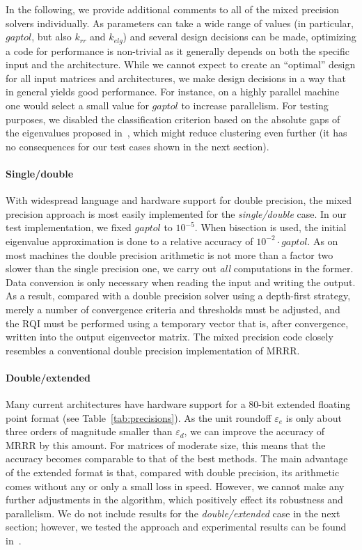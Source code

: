 \documentclass[final]{siamltex}
\begin{document}
In the following, we provide
additional comments to all of the mixed precision solvers individually. 
As parameters can take a wide range of values (in particular, $gaptol$, but also $k_{rr}$ and
$k_{elg}$) and several design decisions can be made, optimizing a code for performance
is non-trivial as it generally depends on both the specific input and the architecture. 
While we cannot expect to create an ``optimal''
design for all input matrices and architectures, we make design
decisions in a way that in general yields good performance. 
For instance, on
a highly parallel machine one would select a small value for $gaptol$ to
increase parallelism. For testing purposes, we disabled the
classification criterion based on the absolute gaps of the eigenvalues
proposed in~\cite{VoemelRefinedTree2007tr}, which might reduce clustering even
further (it has no consequences for our test cases shown in the next section). 

\paragraph{Single/double} With widespread language and hardware support for
  double precision, the mixed precision approach is most easily implemented
  for the {\it single/double} case. In our test implementation, we fixed
  $gaptol$ to $10^{-5}$. When bisection is used, the initial eigenvalue
  approximation is done to a relative accuracy of $10^{-2} \cdot gaptol$. As
  on most machines the double precision arithmetic is not more than a factor two
  slower than the single precision one, we carry out {\it all} computations in
  the former. Data conversion is only necessary when reading the input and
  writing the output. As a result, compared with a double precision solver
  using a depth-first strategy,
  merely a number of convergence criteria and thresholds must be
  adjusted, and the RQI must be performed using a temporary vector that is,
  after convergence, written into the output eigenvector matrix. The mixed precision code
  closely resembles a conventional double precision implementation of MRRR.
\paragraph{Double/extended} Many current architectures have hardware
  support for a 80-bit extended floating point format (see
  Table~\ref{tab:precisions}). As the unit roundoff $\varepsilon_e$ is only
  about three orders of magnitude smaller than $\varepsilon_d$, we can 
  improve the accuracy of MRRR by this amount. For matrices of moderate size, this means
  that the accuracy becomes comparable to that of the best methods. The main
  advantage of the extended format is that, compared with double precision, its
  arithmetic comes without any or only a small loss in speed. However, we
  cannot make any further adjustments in the algorithm, which 
  positively effect its robustness and parallelism. 
  We do not include results for the {\it double/extended}
case in the next section; however, we tested the approach and experimental
results can be found in~\cite{mydiss,mixedtr}.  
\end{document}
